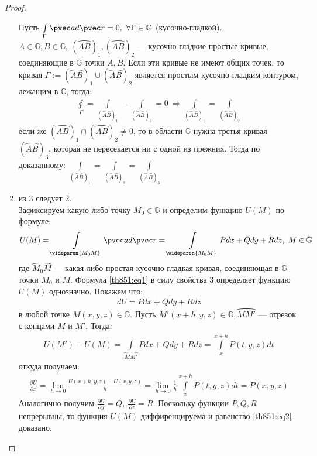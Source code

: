 \begin{proof}
\begin{enumerate}
      Пусть $\int\limits_{\Gamma} \pvec a d \pvec r = 0, \ \forall \Gamma \in
      \mathbb{G}$ (кусочно-гладкой). $A \in \mathbb{G}, B \in \mathbb{G}, \
      (\wideparen{AB})_1, (\wideparen{AB})_2$ --- кусочно гладкие простые
      кривые, соединяющие в $\mathbb{G}$ точки $A, B$. Если эти кривые не имеют
      общих точек, то кривая $\Gamma := (\wideparen{AB})_1 \cup
      (\wideparen{AB})_2$ является простым кусочно-гладким контуром, лежащим в
      $\mathbb{G}$, тогда:
      \begin{gather*}
        \oint\limits_{\Gamma} = \int\limits_{(\wideparen{AB})_1} -
        \int\limits_{(\wideparen{AB})_2} = 0 \ \Longrightarrow
        \int\limits_{(\wideparen{AB})_1} = \int\limits_{(\wideparen{AB})_2}
      \end{gather*}
      если же $(\wideparen{AB})_1 \cap (\wideparen{AB})_2 \not = 0$, то в
      области $\mathbb{G}$ нужна третья кривая $(\wideparen{AB})_3$, которая не
      пересекается ни с одной из прежних. Тогда по доказанному:
      $\int\limits_{(\wideparen{AB})_1} = \int\limits_{(\wideparen{AB})_2} =
      \int\limits_{(\wideparen{AB})_3}$
    \item из 3 следует 2. \\

      Зафиксируем какую-либо точку $M_0 \in \mathbb{G}$ и определим функцию
      $U(M)$ по формуле:
      \begin{gather}
        U(M) = \int\limits_{\wideparen{M_0M}} \pvec a d \pvec r =
        \int\limits_{\wideparen{M_0M}} Pdx + Qdy + Rdz, \ M \in \mathbb{G}
        \label{th851:eq1}
      \end{gather}
      где $\wideparen{M_0M}$ --- какая-либо простая кусочно-гладкая кривая,
      соединяющая в $\mathbb{G}$ точки $M_0$ и $M$. Формула \eqref{th851:eq1} в
      силу свойства 3 определяет функцию $U(M)$ однозначно. Покажем что:
      \begin{gather}
        dU = Pdx + Qdy + Rdz
        \label{th851:eq2}
      \end{gather}
      в любой точке $M(x, y, z) \in \mathbb{G}$. Пусть $M'(x + h, y, z) \in
      \mathbb{G}, \wideparen{MM'}$ --- отрезок с концами $M$ и $M'$. Тогда:
      \begin{gather*}
        U(M') - U(M) = \int\limits_{\wideparen{MM'}} Pdx + Qdy + Rdz =
        \int\limits_x^{x + h} P(t, y, z) dt
      \end{gather*}
      откуда получаем:
      \begin{gather*}
        \frac{\partial U}{\partial x} = \lim\limits_{h \to 0} \frac{U(x + h, y,
        z) - U(x, y, z)}{h} = \lim\limits_{h \to 0} \frac{1}{h}
        \int\limits_x^{x+h} P(t, y, z) dt = P(x, y, z)
      \end{gather*}
      Аналогично получим $\frac{\partial U}{\partial y} = Q, \ \frac{\partial
      U}{\partial z} = R$. Поскольку функции $P, Q, R$ непрерывны, то функция
      $U(M)$ диффиренцируема и равенство \eqref{th851:eq2} доказано.
  \end{enumerate}
\end{proof}

